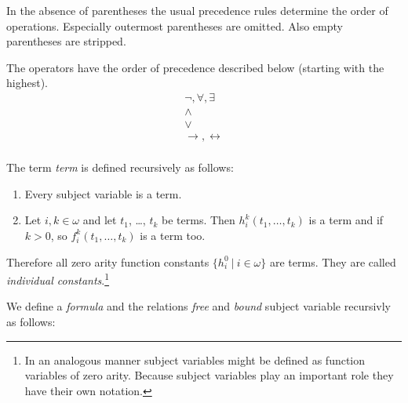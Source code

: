 \documentclass[a4paper,german,10pt,twoside]{book}
\theoremstyle{definition}
\theoremstyle{remark}
\begin{document}
In the absence of parentheses the usual precedence rules determine the order of operations. Especially outermost parentheses are omitted. Also empty parentheses are stripped.

\par
The operators have the order of precedence described below (starting with the highest).
$$
\begin{array}{c}
  \neg, \forall, \exists  \\
  \land \\
  \lor \\
  \rightarrow, \leftrightarrow \\
\end{array}
$$

\par
The term \emph{term} is defined recursively as follows:

\begin{enumerate}
\item Every subject variable is a term. 
\item Let $i, k \in \omega$ and let $t_1$, \ldots, $t_k$ be terms. Then $h^k_i(t_1, \ldots, t_k)$ is a term and if $k > 0$, so $f^k_i(t_1, \ldots, t_k)$ is a term too.
\end{enumerate}

Therefore all zero arity function constants $\{h^0_i~|~i \in \omega\}$ are terms. They are called \emph{individual constants}.\footnote{In an analogous manner subject variables might be defined as function variables of zero arity. Because subject variables play an important role they have their own notation.}

\par
We define a \emph{formula} and the relations \emph{free} and \emph{bound} subject variable recursivly as follows:
\end{document}
